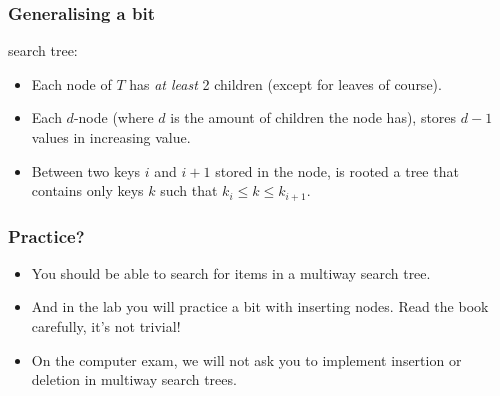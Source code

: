 \begin{frame}
	\frametitle{Generalising a bit}
 search tree:
			\begin{itemize}
				\item Each node of $T$ has \textit{at least} 2 children (except for leaves of course).
				\item Each $d$-node (where $d$ is the amount of children the node has), stores $d-1$ values in increasing value.
				\item Between two keys $i$ and $i+1$ stored in the node, is rooted a tree that contains only keys $k$ such that
					$k_i \leq k \leq k_{i+1}$.
			\end{itemize}
			

	
\end{frame}

\begin{frame}
	\frametitle{Practice?}
	
			\begin{itemize}
				\item You should be able to search for items in a multiway search tree.
				\item And in the lab you will practice a bit with inserting nodes. Read the book carefully, it's not trivial!
				\item On the computer exam, we will not ask you to implement insertion or deletion in multiway search trees.
			\end{itemize}
\end{frame}

